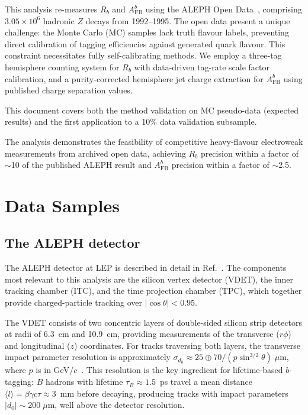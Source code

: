 \documentclass[11pt,a4paper]{article}
\begin{document}
This analysis re-measures $R_b$ and $A_\text{FB}^b$ using the ALEPH
Open Data~\cite{ALEPH:opendata}, comprising $3.05 \times 10^6$ hadronic
$Z$ decays from 1992--1995.
The open data present a unique challenge: the Monte Carlo (MC) samples
lack truth flavour labels, preventing direct calibration of tagging
efficiencies against generated quark flavour.
This constraint necessitates fully self-calibrating methods.
We employ a three-tag hemisphere counting system for $R_b$ with
data-driven tag-rate scale factor calibration, and a purity-corrected
hemisphere jet charge extraction for $A_\text{FB}^b$ using published
charge separation values.

This document covers both the method validation on MC pseudo-data
(expected results) and the first application to a 10\% data
validation subsample.

The analysis demonstrates the feasibility of competitive heavy-flavour
electroweak measurements from archived open data, achieving
$R_b$ precision within a factor of $\sim$10 of the published ALEPH
result and $A_\text{FB}^b$ precision within a factor of $\sim$2.5.

\section{Data Samples}
\label{sec:data}

\subsection{The ALEPH detector}
\label{sec:data:detector}

The ALEPH detector at LEP is described in detail
in Ref.~\cite{ALEPH:sigma_had}.
The components most relevant to this analysis are the silicon
vertex detector (VDET), the inner tracking chamber (ITC), and
the time projection chamber (TPC), which together provide
charged-particle tracking over $|\cos\theta| < 0.95$.

The VDET consists of two concentric layers of double-sided silicon
strip detectors at radii of 6.3~cm and 10.9~cm, providing
measurements of the transverse ($r\phi$) and longitudinal ($z$)
coordinates.
For tracks traversing both layers, the transverse impact parameter
resolution is approximately
$\sigma_{d_0} \approx 25 \oplus 70/(p\sin^{3/2}\theta)\;\mu$m,
where $p$ is in GeV/$c$~\cite{ALEPH:Rb:precise}.
This resolution is the key ingredient for lifetime-based $b$-tagging:
$B$ hadrons with lifetime $\tau_B \approx 1.5$~ps travel a mean
distance $\langle l \rangle = \beta\gamma c\tau \approx 3$~mm
before decaying, producing tracks with impact parameters
$|d_0| \sim 200\;\mu$m, well above the detector resolution.
\end{document}
